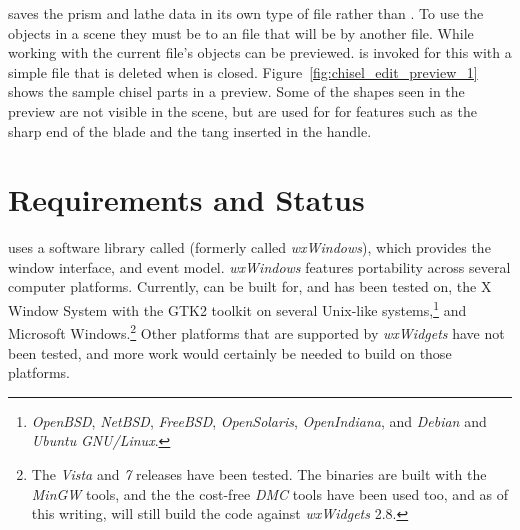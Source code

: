 \IXpkgu{} saves the prism and lathe data in its own type
of file rather than \IXpov{} .
To use the objects in a \IXpov{} scene they
must be  to an  file that will be
 by another  file. While
working with \IXpkg{} the current file's objects can
be previewed. \IXpov{} is invoked for this with a simple
 file that is deleted when \IXpov{} is closed.
Figure~\ref{fig:chisel_edit_preview_1}
shows the sample chisel parts in a \IXpov{} preview. Some
of the shapes seen in the preview are not visible in
the scene, but are used for
 for features
such as the sharp end of the blade and the tang inserted
in the handle.


\section{Requirements and Status}%

\IXpkgu{} uses a software library called 
(formerly called \emph{wxWindows}), which provides the window
interface, and event model. \emph{wxWindows} features
portability across several computer platforms. Currently,
\IXpkg{} can be built for, and has been tested on, the
X Window System with the GTK2 toolkit on several
Unix-like systems,\footnote{
\emph{OpenBSD}, \emph{NetBSD}, \emph{FreeBSD},
\emph{OpenSolaris}, \emph{OpenIndiana}, and
\emph{Debian} and \emph{Ubuntu} \emph{GNU/Linux}.
}
and Microsoft Windows.\footnote{
The \emph{Vista} and \emph{7} releases have been tested.
The binaries are built with the \emph{MinGW} tools, and
the the cost-free \emph{DMC} tools have been used too,
and as of this writing, will still build the code against
\emph{wxWidgets} 2.8.
}
Other platforms that are supported by \emph{wxWidgets} have
not been tested, and more work would certainly be needed to
build \IXpkg{} on those platforms.

